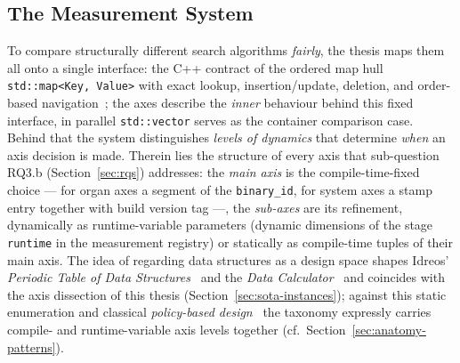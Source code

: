 \begin{nurkurz}
\section{The Measurement System}\label{sec:measurement-system}
To compare structurally different search algorithms \emph{fairly}, the thesis maps them all onto a single
interface: the C++ contract of the ordered map hull \texttt{std::map<Key,\,Value>} with exact lookup,
insertion/update, deletion, and order-based navigation~\cite{iso_cpp}; the axes describe the \emph{inner}
behaviour behind this fixed interface, in parallel \texttt{std::vector} serves as the container comparison
case. Behind that the system distinguishes \emph{levels of dynamics} that determine \emph{when} an axis
decision is made. Therein lies the structure of every axis that sub-question RQ3.b (Section~\ref{sec:rqs})
addresses: the \emph{main axis} is the compile-time-fixed choice --- for organ axes a segment of the
\texttt{binary\_id}, for system axes a stamp entry together with build version tag ---, the
\emph{sub-axes} are its refinement, dynamically as runtime-variable parameters (dynamic dimensions of the
stage \texttt{runtime} in the measurement registry) or statically as compile-time tuples of their main
axis. The idea of regarding data structures as a design space shapes Idreos' \emph{Periodic Table of Data
Structures}~\cite{idreos2018periodic} and the \emph{Data Calculator}~\cite{idreos2018datacalculator} and
coincides with the axis dissection of this thesis (Section~\ref{sec:sota-instances}); against this static
enumeration and classical \emph{policy-based design}~\cite{alexandrescu2001modern} the taxonomy expressly
carries compile- and runtime-variable axis levels together (cf.\ Section~\ref{sec:anatomy-patterns}).
\end{nurkurz}

